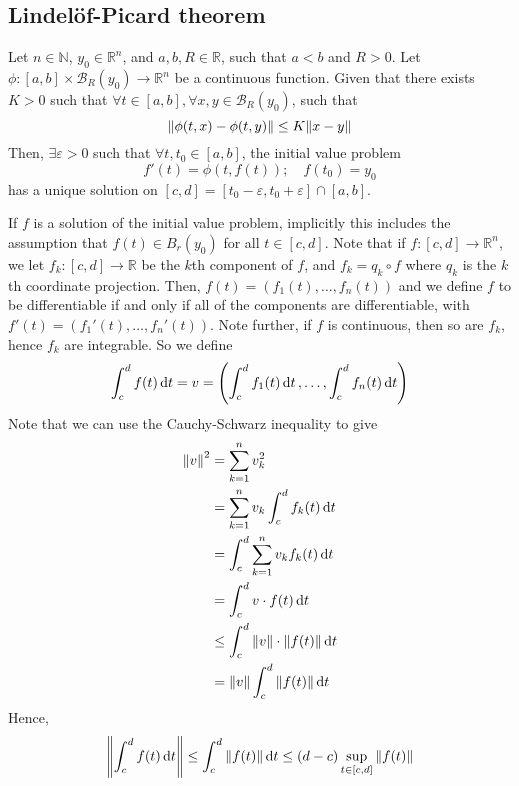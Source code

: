 \subsection{Lindel\"of-Picard theorem}
\begin{theorem}
	Let \( n \in \mathbb N \), \( y_0 \in \mathbb R^n \), and \( a,b,R \in \mathbb R \), such that \( a < b \) and \( R > 0 \).
	Let \( \phi \colon [a,b] \times \mathcal B_R(y_0) \to \mathbb R^n \) be a continuous function.
	Given that there exists \( K > 0 \) such that \( \forall t \in [a,b], \forall x,y \in \mathcal B_R(y_0) \), such that
	\[
		\norm{\phi(t,x) - \phi(t,y)} \leq K \norm{x-y}
	\]
	Then, \( \exists \varepsilon > 0 \) such that \( \forall t, t_0 \in [a,b] \), the initial value problem
	\[
		f'(t) = \phi(t, f(t));\quad f(t_0) = y_0
	\]
	has a unique solution on \( [c,d] = [t_0 - \varepsilon, t_0 + \varepsilon] \cap [a,b] \).
\end{theorem}
\begin{remark}
	If \( f \) is a solution of the initial value problem, implicitly this includes the assumption that \( f(t) \in B_r(y_0) \) for all \( t \in [c,d] \).
	Note that if \( f \colon [c,d] \to \mathbb R^n \), we let \( f_k \colon [c,d] \to \mathbb R \) be the \( k \)th component of \( f \), and \( f_k = q_k \circ f \) where \( q_k \) is the \( k \)th coordinate projection.
	Then, \( f(t) = (f_1(t), \dots, f_n(t)) \) and we define \( f \) to be differentiable if and only if all of the components are differentiable, with \( f'(t) = (f_1'(t), \dots, f_n'(t)) \).
	Note further, if \( f \) is continuous, then so are \( f_k \), hence \( f_k \) are integrable.
	So we define
	\[
		\int_c^d f(t) \dd{t} = v = \qty(\int_c^d f_1(t) \dd{t}, \dots, \int_c^d f_n(t) \dd{t})
	\]
	Note that we can use the Cauchy-Schwarz inequality to give
	\begin{align*}
		\norm{v}^2 & = \sum_{k=1}^n v_k^2                            \\
		           & = \sum_{k=1}^n v_k \int_c^d f_k(t) \dd{t}       \\
		           & = \int_c^d \sum_{k=1}^n v_k f_k(t) \dd{t}       \\
		           & = \int_c^d v \cdot f(t) \dd{t}                  \\
		           & \leq \int_c^d \norm{v} \cdot \norm{f(t)} \dd{t} \\
		           & = \norm{v} \int_c^d \norm{f(t)} \dd{t}
	\end{align*}
	Hence,
	\[
		\norm{\int_c^d f(t) \dd{t}} \leq \int_c^d \norm{f(t)} \dd{t} \leq (d-c) \sup_{t \in [c,d]} \norm{f(t)}
	\]
\end{remark}
